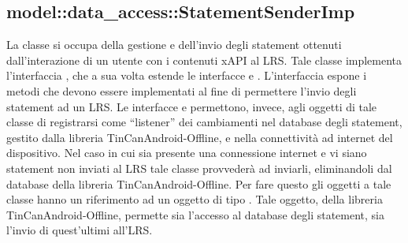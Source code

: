 \documentclass[../Tesi.tex]{subfiles}
\begin{document}
		\subsection{model::data\_access::StatementSenderImp}
		La classe  si occupa della gestione e dell'invio degli statement ottenuti dall'interazione di un utente con i contenuti xAPI al LRS. Tale classe implementa l'interfaccia , che a sua volta estende le interfacce  e . L'interfaccia  espone i metodi che devono essere implementati al fine di permettere l'invio degli statement ad un LRS. Le interfacce  e  permettono, invece, agli oggetti di tale classe di registrarsi come ``listener'' dei cambiamenti nel database degli statement, gestito dalla libreria TinCanAndroid-Offline, e nella connettività ad internet del dispositivo. Nel caso in cui sia presente una connessione internet e vi siano statement non inviati al LRS tale classe provvederà ad inviarli, eliminandoli dal database della libreria TinCanAndroid-Offline. Per fare questo gli oggetti a tale classe hanno un riferimento ad un oggetto di tipo . Tale oggetto, della libreria TinCanAndroid-Offline, permette sia l'accesso al database degli statement, sia l'invio di quest'ultimi all'LRS.
\end{document}
